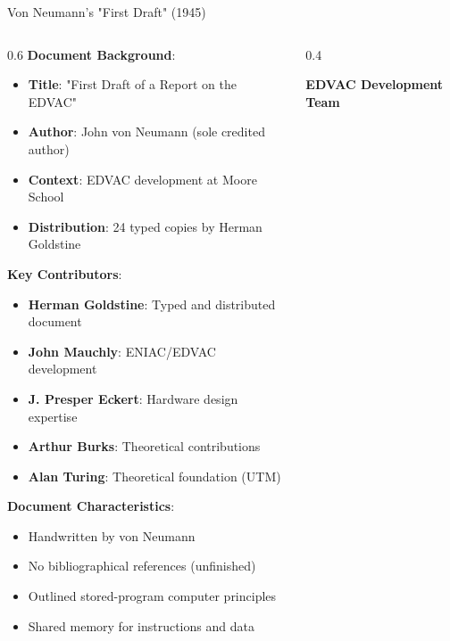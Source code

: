 \documentclass[aspectratio=169]{beamer}
\newcommand{\concept}[1]{\textbf{\color{darkblue}#1}}
\begin{document}
\begin{frame}{Von Neumann's "First Draft" (1945)}
\begin{columns}
\begin{column}{0.6\textwidth}
\concept{Document Background}:
\begin{itemize}
\item \textbf{Title}: "First Draft of a Report on the EDVAC"
\item \textbf{Author}: John von Neumann (sole credited author)
\item \textbf{Context}: EDVAC development at Moore School
\item \textbf{Distribution}: 24 typed copies by Herman Goldstine
\end{itemize}

\vspace{0.3cm}
\concept{Key Contributors}:
\begin{itemize}
\item \textbf{Herman Goldstine}: Typed and distributed document
\item \textbf{John Mauchly}: ENIAC/EDVAC development
\item \textbf{J. Presper Eckert}: Hardware design expertise
\item \textbf{Arthur Burks}: Theoretical contributions
\item \textbf{Alan Turing}: Theoretical foundation (UTM)
\end{itemize}

\vspace{0.3cm}
\concept{Document Characteristics}:
\begin{itemize}
\item Handwritten by von Neumann
\item No bibliographical references (unfinished)
\item Outlined stored-program computer principles
\item Shared memory for instructions and data
\end{itemize}
\end{column}
\begin{column}{0.4\textwidth}
\begin{center}
\textbf{EDVAC Development Team}
\vspace{0.3cm}

\end{center}
\end{column}
\end{columns}
\end{frame}
\end{document}
